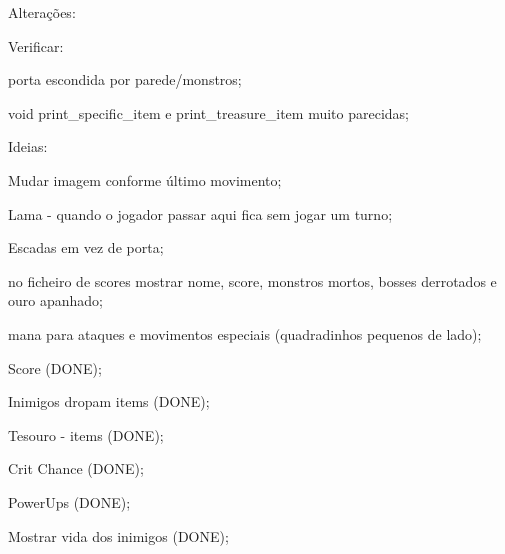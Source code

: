 Alterações\+:

Verificar\+:
\begin{DoxyItemize}
\item porta escondida por parede/monstros;
\item void print\+\_\+specific\+\_\+item e print\+\_\+treasure\+\_\+item muito parecidas;
\end{DoxyItemize}

Ideias\+:


\begin{DoxyItemize}
\item Mudar imagem conforme último movimento;
\item Lama -\/ quando o jogador passar aqui fica sem jogar um turno;
\item Escadas em vez de porta;
\item no ficheiro de scores mostrar nome, score, monstros mortos, bosses derrotados e ouro apanhado;
\item mana para ataques e movimentos especiais (quadradinhos pequenos de lado);
\item Score (D\+O\+NE);
\item Inimigos dropam items (D\+O\+NE);
\item Tesouro -\/ items (D\+O\+NE);
\item Crit Chance (D\+O\+NE);
\item Power\+Ups (D\+O\+NE);
\item Mostrar vida dos inimigos (D\+O\+NE); 
\end{DoxyItemize}